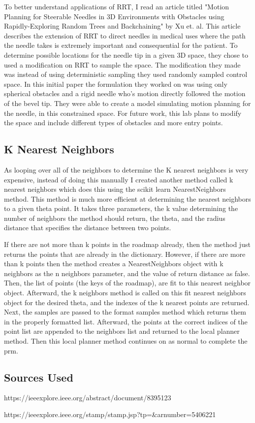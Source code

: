 \documentclass{article}
\begin{document}
To better understand applications of RRT, I read an article titled "Motion Planning for Steerable Needles in 3D Environments with Obstacles using Rapidly-Exploring Random Trees and Backchaining" by Xu et. al. This article describes the extension of RRT to direct needles in medical uses where the path the needle takes is extremely important and consequential for the patient. To determine possible locations for the needle tip in a given 3D space, they chose to used a modification on RRT to sample the space. The modification they made was instead of using deterministic sampling they used randomly sampled control space. In this initial paper the formulation they worked on was using only spherical obstacles and a rigid needle who's motion directly followed the motion of the bevel tip. They were able to create a model simulating motion planning for the needle, in this constrained space. For future work, this lab plans to modify the space and include different types of obstacles and more entry points. 

\subsection{K Nearest Neighbors}
As looping over all of the neighbors to determine the K nearest neighbors is very expensive, instead of doing this manually I created another method called k nearest neighbors which does this using the scikit learn NearestNeighbors method. This method is much more efficient at determining the nearest neighbors to a given theta point. It takes three parameters, the k value determining the number of neighbors the method should return, the theta, and the radius distance that specifies the distance between two points. 

If there are not more than k points in the roadmap already, then the method just returns the points that are already in the dictionary. However, if there are more than k points then the method creates a NearestNeighbors object with k neighbors as the n neighbors parameter, and the value of return distance as false. Then, the list of points (the keys of the roadmap), are fit to this nearest neighbor object. Afterward, the k neighbors method is called on this fit nearest neighbors object for the desired theta, and the indexes of the k nearest points are returned. Next, the samples are passed to the format samples method which returns them in the properly formatted list. Afterward, the points at the correct indices of the point list are appended to the neighbors list and returned to the local planner method. Then this local planner method continues on as normal to complete the prm. 

\subsection{Sources Used}

https://ieeexplore.ieee.org/abstract/document/8395123

https://ieeexplore.ieee.org/stamp/stamp.jsp?tp=&arnumber=5406221
\end{document}
